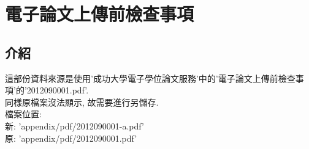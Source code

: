 \newpage
{}

\chapter{電子論文上傳前檢查事項}
\label{appendix:e-paper_upload}

\section{介紹}
這部份資料來源是使用'成功大學電子學位論文服務'中的'電子論文上傳前檢查事項'的'2012090001.pdf'.\\

同樣原檔案沒法顯示, 故需要進行另儲存.\\

檔案位置:\\
新: 'appendix/pdf/2012090001-a.pdf'\\
原: 'appendix/pdf/2012090001.pdf'\\



